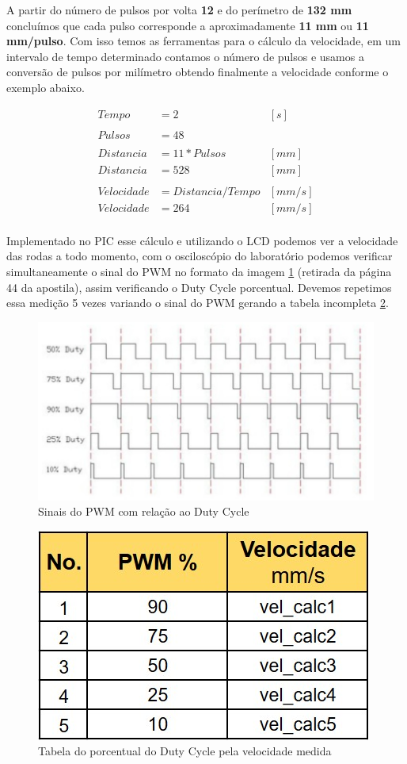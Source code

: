 \documentclass{article}
\begin{document}
A partir do número de pulsos por volta \textbf{12} e do perímetro de \textbf{132 mm} concluímos que cada pulso corresponde a aproximadamente \textbf{11 mm}  ou \textbf{11 mm/pulso}. Com isso temos as ferramentas para o cálculo da velocidade, em um intervalo de tempo determinado contamos o número de pulsos e usamos a conversão de pulsos por milímetro obtendo finalmente a velocidade conforme o exemplo abaixo.\par

\begin{align*}
    Tempo &= 2 &[s]\\
    \\
    Pulsos &= 48 \\
    \\
    Distancia &= 11 * Pulsos &[mm] \\
    Distancia &= 528 &[mm]\\
    \\
    Velocidade &= Distancia / Tempo &[mm/s]\\
    Velocidade &= 264 &[mm/s]\\
\end{align*}

Implementado no PIC esse cálculo e utilizando o LCD podemos ver a velocidade das rodas a todo momento, com o osciloscópio do laboratório podemos verificar simultaneamente o sinal do PWM no formato da imagem \ref{fig:DutyCycle} (retirada da página 44 da apostila), assim verificando o Duty Cycle porcentual. Devemos repetimos essa medição 5 vezes variando o sinal do PWM gerando a tabela incompleta \ref{fig:speed}.\par

\begin{figure}[H]
    \centering
    \includegraphics[width = .8\linewidth]{images/SinalPWM.jpg}
    \caption{Sinais do PWM com relação ao Duty Cycle}
    \label{fig:DutyCycle}
\end{figure}

\begin{figure}[H]
    \centering
    \includegraphics[width = .4\linewidth]{images/tabelavelocidade.jpg}
    \caption{Tabela do porcentual do Duty Cycle pela velocidade medida}
    \label{fig:speed}
\end{figure}
\end{document}
